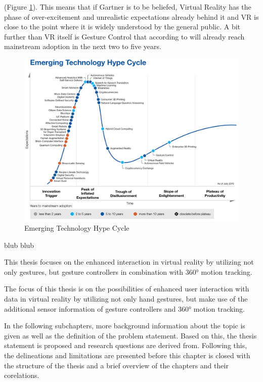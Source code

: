  (Figure \ref{fig:hypecycle}). This means that if Gartner is to be beliefed, Virtual Reality has the phase of over-excitement and unrealistic expectations already behind it and VR is close to the point where it is widely understood by the general public. A bit further than VR itself is Gesture Control that according to \cite{Gartner2015} will already reach mainstream adoption in the next two to five years.
\begin{figure}[h]
	\begin{center}
		\includegraphics[width=14cm]{03_Figures/03_Gartner/Gartner_EmergingTech2015.png}
		\caption[Emerging Technology Hype Cycle]{Emerging Technology Hype Cycle \citep{Gartner2015b}}
		\label{fig:hypecycle}
	\end{center}
\end{figure}



blub
\cite{Safrudin2015}
blub

This thesis focuses on the enhanced interaction in virtual reality by utilizing not only gestures, but gesture controllers in combination with 360° motion tracking.



The focus of this thesis is on the possibilities of enhanced user interaction with data in virtual reality by utilizing not only hand gestures, but make use of the additional sensor information of gesture controllers and 360° motion tracking.

In the following subchapters, more background information about the topic is given as well as the definition of the problem statement. Based on this, the thesis statement is proposed and research questions are derived from. Following this, the delineations and limitations are presented before this chapter is closed with the structure of the thesis and a brief overview of the chapters and their corelations.


